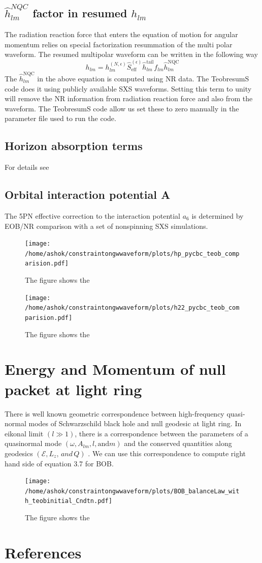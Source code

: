 \documentclass[prd,preprintnumbers,onecolumn,eqsecnum,floatfix,letter]{revtex4}
\begin{document}
\subsection{$\hat{h}^{NQC}_{lm}$ factor in resumed $h_{lm}$} 
The radiation reaction force that enters the equation of motion for angular momentum relies on special factorization resummation of the multi polar waveform. The resumed multipolar waveform can be written in the following way
\begin{equation}
	h_{lm} = h_{lm}^{\left(N, \epsilon\right)}\hat{S}_{\text{eff}}^{\left(\epsilon\right)}\hat{h}^{\text{tail}}_{lm}f_{lm}\hat{h}^{\text{NQC}}_{lm}
\end{equation} 
The $\hat{h}^{\text{NQC}}_{lm}$ in the above equation is computed using NR data. The TeobresumS code does it using publicly available SXS waveforms. Setting this term to unity will remove the NR information from radiation reaction force and also from the waveform. The TeobresumS code allow us set these to zero manually in the parameter file used to run the code.
\subsection{Horizon absorption terms} 
For details see \cite{Bernuzzi2012PhRvD}
\subsection{Orbital interaction potential A}
The 5PN effective correction to the interaction potential \cite{Nagar2016} $a_6$ is determined by EOB/NR comparison with a set of nonspinning SXS simulations.
\begin{figure}
	\texttt{[image: /home/ashok/constraintongwwaveform/plots/hp\_pycbc\_teob\_comparision.pdf]}
	\caption{The figure shows the }
	\label{fig:teobhp}
\end{figure}

\begin{figure}
	\texttt{[image: /home/ashok/constraintongwwaveform/plots/h22\_pycbc\_teob\_comparision.pdf]}
	\caption{The figure shows the }
	\label{fig:teobh22}
\end{figure} 

 
\section{Energy and Momentum of null packet at light ring}
There is well known geometric correspondence between high-frequency quasi-normal modes of Schwarzschild black hole and null geodesic at light ring. In eikonal limit $\left(l\gg1\right)$, there is a correspondence between the parameters of a quasinormal mode $\left(\omega, A_{lm}, l, \text{and} m\right)$ and the conserved quantities along geodesics $\left(\mathcal{E}, \mathit{L_z}, \,and\, Q\right)$ \cite{Yang2012PhRvD}. We can use this correspondence to compute right hand side of equation 3.7 for BOB. 
\begin{figure}
 	\texttt{[image: /home/ashok/constraintongwwaveform/plots/BOB\_balanceLaw\_with\_teobinitial\_Cndtn.pdf]}
 	\caption{The figure shows the }
 	\label{fig:teobh22}
\end{figure} 
\section*{References}



\end{document}
